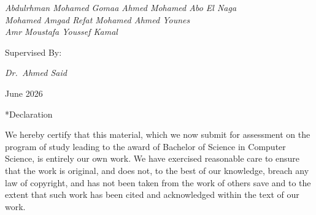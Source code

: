 \documentclass[12pt, a4paper, oneside]{report}
\makeatletter
\newcommand{\chapformat}[1]{%
  \centering
  {\fontsize{14}{17}\selectfont\itshape\addfontfeatures{LetterSpace=3.5}%
    \MakeUppercase{\chaptertitlename}\ \thechapter}\\[24pt]%
  {\fontsize{16}{19}\selectfont\bfseries\addfontfeatures{LetterSpace=0}%
    \MakeUppercase{#1}}%
}
\newcommand{\chapformatstar}[1]{%
  \centering
  {\fontsize{16}{19}\selectfont\bfseries\MakeUppercase{#1}}%
}
\newcommand{\chapterstar}[1]{%
  \clearpage
  \phantomsection
  \edef\@saved@chapcount{\the\value{chapter}}%
  \titleformat{\chapter}[block]{}{}%
    {0pt}{\chapformatstar}%
  \@originalchapter*{#1}%
  \setcounter{chapter}{\@saved@chapcount}%
  \titleformat{\chapter}[block]{}{}%
    {0pt}{\chapformat}%
}
\let\@originalchapter\chapter
\renewcommand{\chapter}{%
  \@ifstar{\chapterstar}{\@originalchapter}%
}
\makeatother
\begin{document}
\begin{titlepage}
  {\fontsize{14}{18}\selectfont\itshape
    Abdulrhman Mohamed Gomaa \quad Ahmed Mohamed Abo El Naga \\[4pt]
    Mohamed Amgad Refat \quad Mohamed Ahmed Younes \\[4pt]
    Amr Moustafa \quad Youssef Kamal
  \par}

  \vspace{24pt}

  {\fontsize{14}{18}\selectfont Supervised By:\par}
  \vspace{6pt}

  {\fontsize{14}{18}\selectfont\itshape Dr.\ Ahmed Said\par}

  \vfill

  {\fontsize{10}{12}\selectfont June 2026\par}
\end{titlepage}


\chapter*{Declaration}
\thispagestyle{empty}

We hereby certify that this material, which we now submit for assessment on the program of study leading to the award of Bachelor of Science in Computer Science, is entirely our own work. We have exercised reasonable care to ensure that the work is original, and does not, to the best of our knowledge, breach any law of copyright, and has not been taken from the work of others save and to the extent that such work has been cited and acknowledged within the text of our work.

\vspace{1.5cm}
\end{document}
